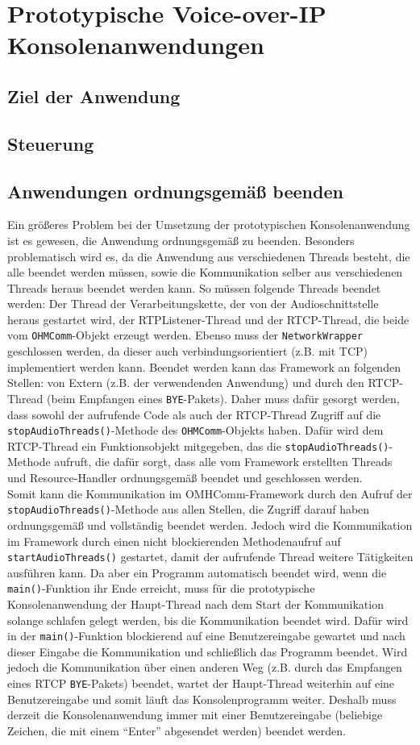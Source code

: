 \chapter{Prototypische Voice-over-IP Konsolenanwendungen}
\label{prototypProgram}
\section{Ziel der Anwendung}
\section{Steuerung}
\section{Anwendungen ordnungsgemäß beenden}
Ein größeres Problem bei der Umsetzung der prototypischen Konsolenanwendung ist es gewesen, die Anwendung ordnungsgemäß zu beenden. Besonders problematisch wird es, da die Anwendung aus verschiedenen Threads besteht, die alle beendet werden müssen, sowie die Kommunikation selber aus verschiedenen Threads heraus beendet werden kann. So müssen folgende Threads beendet werden: Der Thread der Verarbeitungskette, der von der Audioschnittstelle heraus gestartet wird, der RTPListener-Thread und der RTCP-Thread, die beide vom \texttt{OHMComm}-Objekt erzeugt werden. Ebenso muss der \texttt{NetworkWrapper} geschlossen werden, da dieser auch verbindungsorientiert (z.B. mit TCP) implementiert werden kann. Beendet werden kann das Framework an folgenden Stellen: von Extern (z.B. der verwendenden Anwendung) und durch den RTCP-Thread (beim Empfangen eines \texttt{BYE}-Pakets). Daher muss dafür gesorgt werden, dass sowohl der aufrufende Code als auch der RTCP-Thread Zugriff auf die \texttt{stopAudioThreads()}-Methode des \texttt{OHMComm}-Objekts haben. Dafür wird dem RTCP-Thread ein Funktionsobjekt mitgegeben, das die \texttt{stopAudioThreads()}-Methode aufruft, die dafür sorgt, dass alle vom Framework erstellten Threads und Resource-Handler ordnungsgemäß beendet und geschlossen werden.
\\
Somit kann die Kommunikation im OMHComm-Framework durch den Aufruf der \texttt{stopAudioThreads()}-Methode aus allen Stellen, die Zugriff darauf haben ordnungsgemäß und vollständig beendet werden. Jedoch wird die Kommunikation im Framework durch einen nicht blockierenden Methodenaufruf auf \texttt{startAudioThreads()} gestartet, damit der aufrufende Thread weitere Tätigkeiten ausführen kann. Da aber ein Programm automatisch beendet wird, wenn die \texttt{main()}-Funktion ihr Ende erreicht, muss für die prototypische Konsolenanwendung der Haupt-Thread nach dem Start der Kommunikation solange schlafen gelegt werden, bis die Kommunikation beendet wird. Dafür wird in der \texttt{main()}-Funktion blockierend auf eine Benutzereingabe gewartet und nach dieser Eingabe die Kommunikation und schließlich das Programm beendet. Wird jedoch die Kommunikation über einen anderen Weg (z.B. durch das Empfangen eines RTCP \texttt{BYE}-Pakets) beendet, wartet der Haupt-Thread weiterhin auf eine Benutzereingabe und somit läuft das Konsolenprogramm weiter. Deshalb muss derzeit die Konsolenanwendung immer mit einer Benutzereingabe (beliebige Zeichen, die mit einem \enquote{Enter} abgesendet werden) beendet werden.
